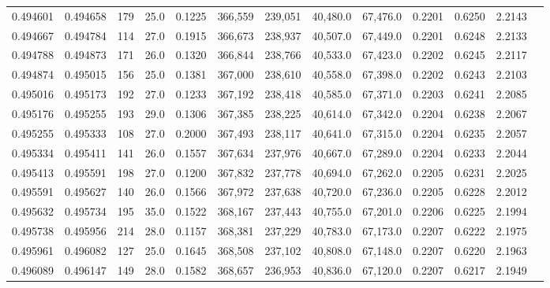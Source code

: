 \begin{tabular}{rrrrrrrrrrrrr}
0.494601 & 0.494658 &   179 & 25.0 &                                     0.1225 & 366,559 & 239,051 &  40,480.0 &  67,476.0 & 0.2201 & 0.6250 & 2.2143 \\
0.494667 & 0.494784 &   114 & 27.0 &                                     0.1915 & 366,673 & 238,937 &  40,507.0 &  67,449.0 & 0.2201 & 0.6248 & 2.2133 \\
0.494788 & 0.494873 &   171 & 26.0 &                                     0.1320 & 366,844 & 238,766 &  40,533.0 &  67,423.0 & 0.2202 & 0.6245 & 2.2117 \\
0.494874 & 0.495015 &   156 & 25.0 &                                     0.1381 & 367,000 & 238,610 &  40,558.0 &  67,398.0 & 0.2202 & 0.6243 & 2.2103 \\
0.495016 & 0.495173 &   192 & 27.0 &                                     0.1233 & 367,192 & 238,418 &  40,585.0 &  67,371.0 & 0.2203 & 0.6241 & 2.2085 \\
0.495176 & 0.495255 &   193 & 29.0 &                                     0.1306 & 367,385 & 238,225 &  40,614.0 &  67,342.0 & 0.2204 & 0.6238 & 2.2067 \\
0.495255 & 0.495333 &   108 & 27.0 &                                     0.2000 & 367,493 & 238,117 &  40,641.0 &  67,315.0 & 0.2204 & 0.6235 & 2.2057 \\
0.495334 & 0.495411 &   141 & 26.0 &                                     0.1557 & 367,634 & 237,976 &  40,667.0 &  67,289.0 & 0.2204 & 0.6233 & 2.2044 \\
0.495413 & 0.495591 &   198 & 27.0 &                                     0.1200 & 367,832 & 237,778 &  40,694.0 &  67,262.0 & 0.2205 & 0.6231 & 2.2025 \\
0.495591 & 0.495627 &   140 & 26.0 &                                     0.1566 & 367,972 & 237,638 &  40,720.0 &  67,236.0 & 0.2205 & 0.6228 & 2.2012 \\
0.495632 & 0.495734 &   195 & 35.0 &                                     0.1522 & 368,167 & 237,443 &  40,755.0 &  67,201.0 & 0.2206 & 0.6225 & 2.1994 \\
0.495738 & 0.495956 &   214 & 28.0 &                                     0.1157 & 368,381 & 237,229 &  40,783.0 &  67,173.0 & 0.2207 & 0.6222 & 2.1975 \\
0.495961 & 0.496082 &   127 & 25.0 &                                     0.1645 & 368,508 & 237,102 &  40,808.0 &  67,148.0 & 0.2207 & 0.6220 & 2.1963 \\
0.496089 & 0.496147 &   149 & 28.0 &                                     0.1582 & 368,657 & 236,953 &  40,836.0 &  67,120.0 & 0.2207 & 0.6217 & 2.1949 \\

\end{tabular}
